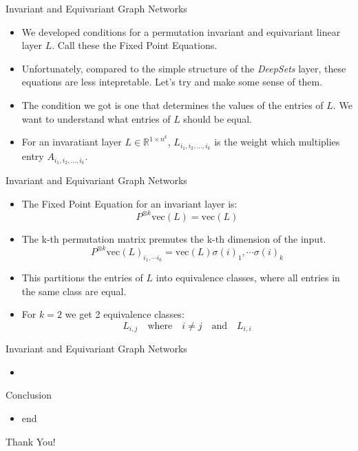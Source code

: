 \documentclass{beamer}
\begin{document}
\begin{frame}{Invariant and Equivariant Graph Networks}
    \begin{itemize}
        \setlength{\itemsep}{\fill}
        \item We developed conditions for a permutation invariant and equivariant linear layer $L$. Call these the Fixed Point Equations.
        \item Unfortunately, compared to the simple structure of the \emph{DeepSets} layer, these equations are less intepretable. Let's try and make some sense of them.
        \item The condition we got is one that determines the values of the entries of $L$. We want to understand what entries of $L$ should be equal.
        \item For an invaratiant layer $L \in \mathbb{R}^{1 \times n^k}$, $L_{i_1,i_2,\ldots,i_k}$ is the weight which multiplies entry $A_{i_1,i_2,\ldots,i_k}$.
    \end{itemize}
\end{frame}
\begin{frame}{Invariant and Equivariant Graph Networks}
    \begin{itemize}
        \setlength{\itemsep}{\fill}
        \item The Fixed Point Equation for an invariant layer is:
        \[ P^{\otimes k}\text{vec}(L) = \text{vec}(L) \]
        \item The k-th permutation matrix premutes the k-th dimension of the input. 
        \[ P^{\otimes k}\text{vec}(L)_{i_1, \cdots i_k} = \text{vec}(L){\sigma(i)_1, \cdots \sigma(i)_k} \]
        \item This partitions the entries of $L$ into equivalence classes, where all entries in the same class are equal.
        \item For $k=2$ we get 2 equivalence classes:
        \[ L_{i,j} \quad \text{where} \quad i \neq j \quad \text{and} \quad L_{i,i} \]
    \end{itemize}
\end{frame}
\begin{frame}{Invariant and Equivariant Graph Networks}
    \begin{itemize}
        \setlength{\itemsep}{\fill}
        \item 
    \end{itemize}
\end{frame}
\begin{frame}{Conclusion}
    \begin{itemize}
        \item end
    \end{itemize}
\end{frame}



\begin{frame}[plain]
    \centering
    \Huge Thank You!
\end{frame}
\end{document}
